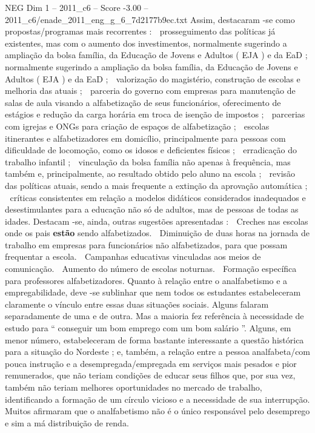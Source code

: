 \begin{textsample}{NEG Dim 1 – 2011\_c6 – Score -3.00 – 2011\_c6/enade\_2011\_eng\_g\_6\_7d2177b9ec.txt}
Assim, destacaram -se como propostas/programas mais recorrentes :  prosseguimento das políticas já existentes, mas com o aumento dos investimentos, normalmente sugerindo a ampliação da bolsa família, da Educação de Jovens e Adultos ( EJA ) e da EaD ; normalmente sugerindo a ampliação da bolsa família, da Educação de Jovens e Adultos ( EJA ) e da EaD ;  valorização do magistério, construção de escolas e melhoria das atuais ;  parceria do governo com empresas para manutenção de salas de aula visando a alfabetização de seus funcionários, oferecimento de estágios e redução da carga horária em troca de isenção de impostos ;  parcerias com igrejas e ONGs para criação de espaços de alfabetização ;  escolas itinerantes e alfabetizadores em domicílio, principalmente para pessoas com dificuldade de locomoção, como os idosos e deficientes físicos ;  erradicação do trabalho infantil ;  vinculação da bolsa família não apenas à frequência, mas também e, principalmente, ao resultado obtido pelo aluno na escola ;  revisão das políticas atuais, sendo a mais frequente a extinção da aprovação automática ;  críticas consistentes em relação a modelos didáticos considerados inadequados e desestimulantes para a educação não só de adultos, mas de pessoas de todas as idades.
Destacam -se, ainda, outras sugestões apresentadas :  Creches nas escolas onde os pais \textbf{estão} sendo alfabetizados.  Diminuição de duas horas na jornada de trabalho em empresas para funcionários não alfabetizados, para que possam frequentar a escola.  Campanhas educativas vinculadas aos meios de comunicação.  Aumento do número de escolas noturnas.  Formação específica para professores alfabetizadores.
Quanto à relação entre o analfabetismo e a empregabilidade, deve -se sublinhar que nem todos os estudantes estabeleceram claramente o vínculo entre essas duas situações sociais.
Alguns falaram separadamente de uma e de outra.
Mas a maioria fez referência à necessidade de estudo para “ conseguir um bom emprego com um bom salário ”.
Alguns, em menor número, estabeleceram de forma bastante interessante a questão histórica para a situação do Nordeste ; e, também, a relação entre a pessoa analfabeta/com pouca instrução e a desempregada/empregada em serviços mais pesados e pior remunerados, que não teriam condições de educar seus filhos que, por sua vez, também não teriam melhores oportunidades no mercado de trabalho, identificando a formação de um círculo vicioso e a necessidade de sua interrupção.
Muitos afirmaram que o analfabetismo não é o único responsável pelo desemprego e sim a má distribuição de renda.

\end{textsample}
